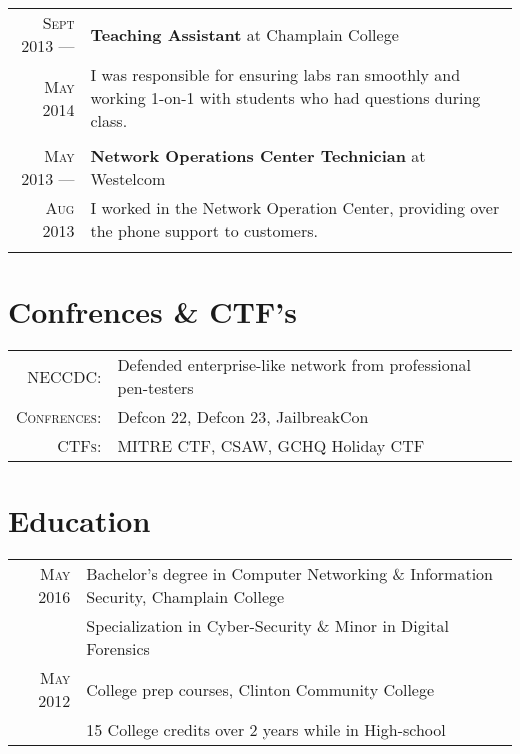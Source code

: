 \documentclass[a4paper,10pt]{article}
\begin{document}
\begin{tabular}{r|p{11cm}}
\textsc{Sept 2013} ---            & \textbf{Teaching Assistant} at Champlain College\\
\textsc{May 2014} \hphantom{---} & \footnotesize{ I was responsible for ensuring labs ran smoothly and working 1-on-1 with students who had questions during class. 
         \vspace{-2mm}
        \vspace*{-\baselineskip}
    }\\
\multicolumn{2}{c}{} \\

\textsc{May 2013} ---            & \textbf{Network Operations Center Technician} at Westelcom\\
\textsc{Aug 2013} \hphantom{---} & \footnotesize{ I worked in the Network Operation Center, providing over the phone support to customers.
         \vspace{-2mm}
        \vspace*{-\baselineskip}
    }\\
\multicolumn{2}{c}{} \\

\end{tabular}

\section{Confrences \& CTF's}
\begin{tabular}{rl}
    \textsc{NECCDC}: & \footnotesize{ Defended enterprise-like network from professional pen-testers }\\
    \textsc{Confrences}: & \footnotesize{ Defcon 22, Defcon 23, JailbreakCon }\\
    \textsc{CTFs}: & \footnotesize{ MITRE CTF, CSAW, GCHQ Holiday CTF }\\
\end{tabular}

\section{Education}
\begin{tabular}{rl}
    \hspace{4mm}\textsc{May 2016} & \footnotesize{Bachelor's degree in  Computer Networking \& Information Security, Champlain College}\\
                          & \footnotesize{Specialization in Cyber-Security \& Minor in Digital Forensics}\\
    \hspace{4mm}\textsc{May 2012} & \footnotesize{College prep courses, Clinton Community College}\\
                          & \footnotesize{15 College credits over 2 years while in High-school}\\
\end{tabular}
\end{document}
